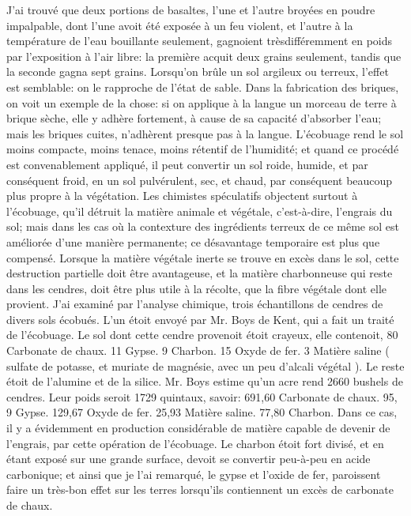 J’ai trouvé que deux portions de basaltes, l’une et l’autre broyées en poudre impalpable, dont l’une avoit été exposée à un feu violent, et l’autre à la température de l’eau bouillante seulement, gagnoient trèsdifféremment en poids par l’exposition à l’air libre: la première acquit deux grains seulement, tandis que la seconde gagna sept grains.
Lorsqu’on brûle un sol argileux ou terreux, l’effet est semblable: on le rapproche de l’état de sable. Dans la fabrication des briques, on voit un exemple de la chose: si on applique à la langue un morceau de terre à brique sèche, elle y adhère fortement, à cause de sa capacité d’absorber l’eau; mais les briques cuites, n’adhèrent presque pas à la langue.
L’écobuage rend le sol moins compacte, moins tenace, moins rétentif de l’humidité; et quand ce procédé est convenablement appliqué, il peut convertir un sol roide, humide, et par conséquent froid, en un\setcounter{page}{272} sol pulvérulent, sec, et chaud, par conséquent beaucoup plus propre à la végétation.
Les chimistes spéculatifs objectent surtout à l’écobuage, qu’il détruit la matière animale et végétale, c’est-à-dire, l’engrais du sol; mais dans les cas où la contexture des ingrédients terreux de ce même sol est améliorée d’une manière permanente; ce désavantage temporaire est plus que compensé. Lorsque la matière végétale inerte se trouve en excès dans le sol, cette destruction partielle doit être avantageuse, et la matière charbonneuse qui reste dans les cendres, doit être plus utile à la récolte, que la fibre végétale dont elle provient.
J’ai examiné par l’analyse chimique, trois échantillons de cendres de divers sols écobués. L’un étoit envoyé par Mr. Boys de Kent, qui a fait un traité de l’écobuage. Le sol dont cette cendre provenoit étoit crayeux, elle contenoit,
80 Carbonate de chaux.
11 Gypse.
9 Charbon.
15 Oxyde de fer.
3 Matière saline ( sulfate de potasse, et muriate de magnésie, avec un peu d’alcali végétal ).
\setcounter{page}{273} Le reste étoit de l'alumine et de la silice. Mr. Boys estime qu'un acre rend 2660 bushels de cendres. Leur poids seroit 1729 quintaux, savoir:
691,60 Carbonate de chaux.
95, 9 Gypse.
129,67 Oxyde de fer.
25,93 Matière saline.
77,80 Charbon.
Dans ce cas, il y a évidemment en production considérable de matière capable de devenir de l'engrais, par cette opération de l'écobuage. Le charbon étoit fort divisé, et en étant exposé sur une grande surface, devoit se convertir peu-à-peu en acide carbonique; et ainsi que je l'ai remarqué, le gypse et l'oxide de fer, paroissent faire un très-bon effet sur les terres lorsqu'ils contiennent un excès de carbonate de chaux.
